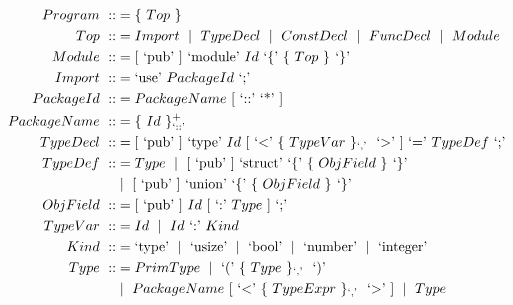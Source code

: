 \documentclass[letterpaper]{article}
\newcommand{\nonterminal}[1]{#1\ }
\newcommand{\terminal}[1]{\text{`#1'}\ }
\newcommand{\gramOption}[1]{[\ #1]\ }
\newcommand*{\gramRepeat}[2][]{\{\ #2\}_{#1}\ }
\newcommand*{\gramSome}[2][]{\{\ #2\}^{+}_{#1}\ }
\newcommand{\gramOr}{\mid\ }
\begin{document}
\begin{align*}
%  
  \nonterminal{Program} ::&= \gramRepeat{\nonterminal{Top}} \\
%
  \nonterminal{Top} ::&= \nonterminal{Import}
    \gramOr \nonterminal{TypeDecl}
    \gramOr \nonterminal{ConstDecl}
    \gramOr \nonterminal{FuncDecl}
    \gramOr \nonterminal{Module} \\
%
  \nonterminal{Module} ::&=
    \gramOption{\terminal{pub}} \terminal{module} \nonterminal {Id}
      \terminal{\{} \gramRepeat{\nonterminal{Top}} \terminal{\}} \\
%
  \nonterminal{Import} ::&=
    \terminal{use} \nonterminal{PackageId} \terminal{;} \\
%
  \nonterminal{PackageId} ::&=
    \nonterminal{PackageName} \gramOption{\terminal{::} \terminal{*}} \\
%
  \nonterminal{PackageName} ::&= \gramSome[\terminal{::}]{\nonterminal{Id}} \\
%
  \nonterminal{TypeDecl} ::&=
    \gramOption{\terminal{pub}} \terminal{type} \nonterminal{Id}
      \gramOption{\terminal{\textless}
        \gramRepeat[\terminal{,}]{\nonterminal{TypeVar}} \terminal{\textgreater}}
      \terminal{=} \nonterminal{TypeDef} \terminal{;} \\
%
  \nonterminal{TypeDef} ::&= \nonterminal{Type}
    \gramOr \gramOption{\terminal{pub}} \terminal{struct}
      \terminal{\{} \gramRepeat{\nonterminal{ObjField}} \terminal{\}} \\
    &\gramOr \gramOption{\terminal{pub}} \terminal{union}
      \terminal{\{} \gramRepeat{\nonterminal{ObjField}} \terminal{\}} \\
%
  \nonterminal{ObjField} ::&=
    \gramOption{\terminal{pub}} \nonterminal{Id}
      \gramOption{\terminal{:} \nonterminal{Type}} \terminal{;} \\
%
  \nonterminal{TypeVar} ::&= \nonterminal{Id}
    \gramOr \nonterminal{Id} \terminal{:} \nonterminal{Kind} \\
%
  \nonterminal{Kind} ::&= \terminal{type} \gramOr \terminal{usize}
    \gramOr \terminal{bool} \gramOr \terminal{number} \gramOr \terminal{integer} \\
%
  \nonterminal{Type} ::&= \nonterminal{PrimType}
    \gramOr \terminal{(} \gramRepeat[\terminal{,}]{\nonterminal{Type}} \terminal{)} \\
    &\gramOr \nonterminal{PackageName}
      \gramOption{\terminal{\textless}
        \gramRepeat[\terminal{,}]{\nonterminal{TypeExpr}} \terminal{\textgreater}}
    \gramOr \nonterminal{Type}

\end{align*}
\end{document}

